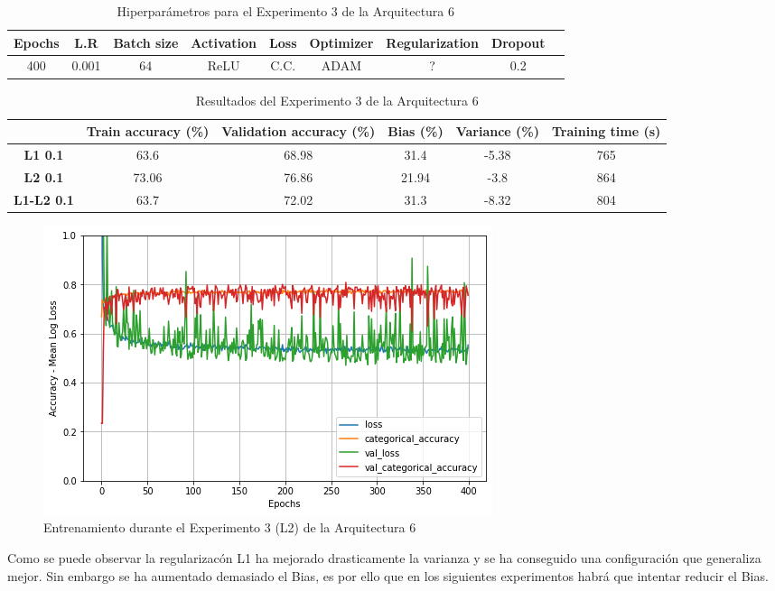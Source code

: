 \documentclass{article}
\begin{document}
      
        \begin{table}[!h]
				\begin{tabular}{|c|c|c|c|c|c|c|c|c|}
					\textbf{Epochs}&\textbf{L.R}&\textbf{Batch size}&\textbf{Activation}&\textbf{Loss}&\textbf{Optimizer}&\textbf{Regularization}&\textbf{Dropout}   \\ \hline
					400 & 0.001 & 64 & ReLU & C.C. & ADAM & ? & 0.2 
				\end{tabular}
				\caption{Hiperpar\'ametros para el Experimento 3 de la Arquitectura 6}
				\label{tab:hip-a6-e2}
			\end{table}

    
   
   \begin{table}[!h]
				\begin{center}
					\begin{tabular}{ c | c | c | c | c | c |}
						\ & \textbf{Train accuracy (\%)} & \textbf{Validation accuracy (\%)} & \textbf{Bias (\%)} & \textbf{Variance (\%)} & \textbf{Training time (s)} \\ \hline
						\textbf{L1 0.1} &63.6   &68.98  & 31.4  & -5.38 &  765 \\ \hline
						\textbf{L2 0.1} & 73.06   & 76.86 &  21.94 & -3.8 &864   \\ \hline
                        \textbf{L1-L2 0.1} &  63.7  &72.02 &  31.3 & -8.32 &804   \\ \hline
					\end{tabular}
					\caption{Resultados del Experimento 3 de la Arquitectura 6}
					\label{tab:res-a2-e5}
				\end{center}
			\end{table}
   
   \begin{figure}[!h]
				\begin{center}
					\includegraphics[scale=0.5]{tr-a6-e3.1.png}		
					\caption{Entrenamiento durante el Experimento 3 (L2) de la Arquitectura 6}	
					\label{tab:tr-a6-e2}
				\end{center}
			\end{figure}
    Como se puede observar la regularizac\'on L1 ha mejorado drasticamente la varianza y se ha conseguido una configuraci\'on que generaliza mejor. Sin embargo se ha aumentado demasiado el Bias, es por ello que en los siguientes experimentos habr\'a que intentar reducir el Bias. 
    
\end{document}
